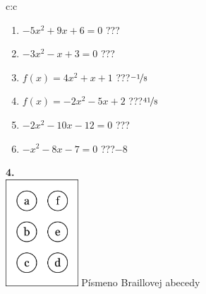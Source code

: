 \documentclass[10pt]{report}
\begin{document}
\begin{tabular}{c:c}
\begin{minipage}[c][104.5mm][t]{0.5\linewidth}
\begin{center}
\begin{minipage}{0.79\linewidth}
\begin{center}
\begin{varwidth}{\linewidth}
\begin{enumerate}
\Large
\item $-5x^2+9x+6=0$\quad \dotfill\; ???\;\dotfill {}
\item $-3x^2-x+3=0$\quad \dotfill\; ???\;\dotfill {}
\item $f(x)=4x^2+x+1$\quad \dotfill\; ???\;\dotfill \quad $\nicefrac{-1}{8}$
\item $f(x)=-2x^2-5x+2$\quad \dotfill\; ???\;\dotfill \quad $\nicefrac{41}{8}$
\item $-2x^2-10x-12=0$\quad \dotfill\; ???\;\dotfill {}
\item $-x^2-8x-7=0$\quad \dotfill\; ???\;\dotfill \quad $-8$
\end{enumerate}
\end{varwidth}
\end{center}
\end{minipage}
\begin{minipage}{0.20\linewidth}
\begin{center}
{\Huge\bfseries 4.} \\[2mm]
\includegraphics[height=40mm]{../images/braille.png}
{\small Písmeno Braillovej abecedy}
\end{center}
\end{minipage}
\end{center}
\end{minipage}
%
\end{tabular}
\newpage
\thispagestyle{empty}
\end{document}
